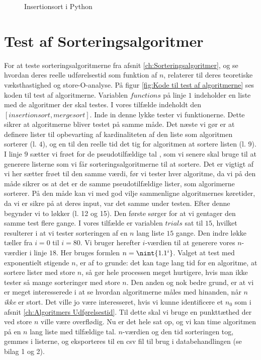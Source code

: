 \begin{figure}
	\begin{center}
		
	\end{center}
	\caption{Insertionsort i Python}
	\label{fig:Insertionsort i Python}
\end{figure}

\section{Test af Sorteringsalgoritmer}
\label{sec:Kode til Test af Sorteringsalgoritmer}

For at teste sorteringsalgoritmerne fra afsnit \ref{ch:Sorteringsalgoritmer}, og se hvordan deres reelle udførelsestid som funktion af $n$, relaterer til deres teoretiske væksthastighed og store-O-analyse. På figur \ref{fig:Kode til test af algoritmerne} ses koden til test af algoritmerne. Variablen $functions$ på linje $1$ indeholder en liste med de algoritmer der skal testes. I vores tilfælde indeholdt den $[insertionsort,mergesort]$. Inde in denne lykke tester vi funktionerne. Dette sikrer at algoritmerne bliver testet på samme måde. Det næste vi gør er at definere lister til opbevarting af kardinaliteten af den liste som algoritmen sorterer (l. $4$), og en til den reelle tid det tig for algoritmen at sortere listen (l. 9).  I linje $9$ sætter vi frøet for de pseudotilfældige tal \cite{python-random}, som vi senere skal bruge til at generere listerne som vi får sorteringsalgoritmerne til at sortere. Det er vigtigt af vi her sætter frøet til den samme værdi, før vi tester hver algoritme, da vi på den måde sikrer os at det er de samme pseudotilfældige lister, som algorimerne sorterer. På den måde kan vi med god vilje sammenligne algoritmernes køretider, da vi er sikre på at deres input, var det samme under testen. Efter denne  begynder vi to løkker (l. 12 og 15). Den første sørger for at vi gentager den samme test flere gange. I vores tilfælde er variablen $trials$ sat til $15$, hvilket resulterer i at vi tester sorteringen af en $n$ lang liste $15$ gange. Den indre løkke tæller fra $i=0$ til $i=80$. Vi bruger herefter $i$-værdien til at generere vores $n$-værdier i linje $18$. Her bruges formlen $n=\nint{1.1^i}$. Valget at test med exponentielt stigende $n$, er af to grunde: det kan tage lang tid for en algoritme, at sortere lister med store $n$, så gør hele processen meget hurtigere, hvis man ikke tester så mange sorteringer med store $n$. Den anden og nok bedre grund, er at vi er meget interesserede i at se hvordan algoritmerne måles med hinanden, når $n$ \emph{ikke} er stort. Det ville jo være interesseret, hvis vi kunne identificere et $n_0$ som i afsnit \ref{ch:Algoritmers Udførelsestid}. Til dette skal vi bruge en punkttæthed der ved store $n$ ville være overflødig. Nu er det hele sat op, og vi kan time algoritmen på en $n$ lang liste med tilfældige tal. $n$-værdien og den tid sorteringen tog, gemmes i listerne, og eksporteres til en csv fil til brug i databehandlingen (se bilag 1 og 2).



